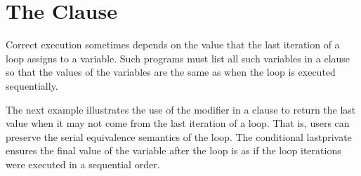 \pagebreak
\section{The  Clause}
\label{sec:lastprivate}

Correct execution sometimes depends on the value that the last iteration of a loop 
assigns to a variable. Such programs must list all such variables in a  
clause  so that the values of the variables are the same as when the loop is executed 
sequentially.



\clearpage
The next example illustrates the use of the  modifier in
a  clause to return the last value when it may not come from
the last iteration of a loop.
That is, users can preserve the serial equivalence semantics of the loop.
The conditional lastprivate ensures the final value of the variable after the loop 
is as if the loop iterations were executed in a sequential order.


